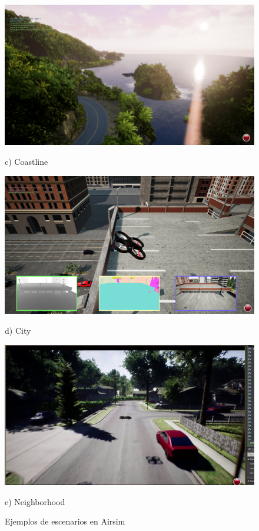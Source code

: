 \begin{figure}[H]
  \begin{minipage}{0.5\textwidth}
      \centering
      \includegraphics[width=\linewidth]{figs/Plataformas_Desarollo/mapas_airsim/Coastline.png}
      \caption*{c) Coastline}
  \end{minipage}%
  \begin{minipage}{0.5\textwidth}
      \centering
      \includegraphics[width=\linewidth]{figs/Plataformas_Desarollo/mapas_airsim/city_airsim.png}
      \caption*{d) City}
  \end{minipage}

  \begin{minipage}{0.5\textwidth}
      \centering
      \includegraphics[width=\linewidth]{figs/Plataformas_Desarollo/mapas_airsim/AirsimNH.jpg}
      \caption*{e) Neighborhood}
  \end{minipage}
  \caption{Ejemplos de escenarios en Airsim}
  \label{f:escenarios_airsim}
\end{figure}


